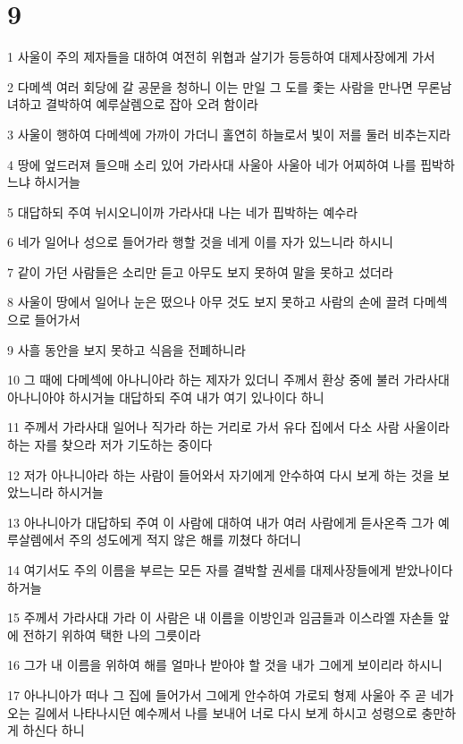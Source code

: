 \chapter{9}

\par 1 사울이 주의 제자들을 대하여 여전히 위협과 살기가 등등하여 대제사장에게 가서
\par 2 다메섹 여러 회당에 갈 공문을 청하니 이는 만일 그 도를 좇는 사람을 만나면 무론남녀하고 결박하여 예루살렘으로 잡아 오려 함이라
\par 3 사울이 행하여 다메섹에 가까이 가더니 홀연히 하늘로서 빛이 저를 둘러 비추는지라
\par 4 땅에 엎드러져 들으매 소리 있어 가라사대 사울아 사울아 네가 어찌하여 나를 핍박하느냐 하시거늘
\par 5 대답하되 주여 뉘시오니이까 가라사대 나는 네가 핍박하는 예수라
\par 6 네가 일어나 성으로 들어가라 행할 것을 네게 이를 자가 있느니라 하시니
\par 7 같이 가던 사람들은 소리만 듣고 아무도 보지 못하여 말을 못하고 섰더라
\par 8 사울이 땅에서 일어나 눈은 떴으나 아무 것도 보지 못하고 사람의 손에 끌려 다메섹으로 들어가서
\par 9 사흘 동안을 보지 못하고 식음을 전폐하니라
\par 10 그 때에 다메섹에 아나니아라 하는 제자가 있더니 주께서 환상 중에 불러 가라사대 아나니아야 하시거늘 대답하되 주여 내가 여기 있나이다 하니
\par 11 주께서 가라사대 일어나 직가라 하는 거리로 가서 유다 집에서 다소 사람 사울이라 하는 자를 찾으라 저가 기도하는 중이다
\par 12 저가 아나니아라 하는 사람이 들어와서 자기에게 안수하여 다시 보게 하는 것을 보았느니라 하시거늘
\par 13 아나니아가 대답하되 주여 이 사람에 대하여 내가 여러 사람에게 듣사온즉 그가 예루살렘에서 주의 성도에게 적지 않은 해를 끼쳤다 하더니
\par 14 여기서도 주의 이름을 부르는 모든 자를 결박할 권세를 대제사장들에게 받았나이다 하거늘
\par 15 주께서 가라사대 가라 이 사람은 내 이름을 이방인과 임금들과 이스라엘 자손들 앞에 전하기 위하여 택한 나의 그릇이라
\par 16 그가 내 이름을 위하여 해를 얼마나 받아야 할 것을 내가 그에게 보이리라 하시니
\par 17 아나니아가 떠나 그 집에 들어가서 그에게 안수하여 가로되 형제 사울아 주 곧 네가 오는 길에서 나타나시던 예수께서 나를 보내어 너로 다시 보게 하시고 성령으로 충만하게 하신다 하니
